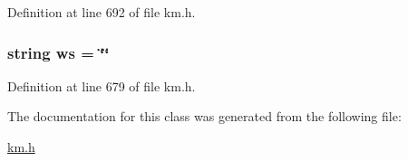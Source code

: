 Definition at line 692 of file km.\+h.

\subsubsection[{\texorpdfstring{ws}{ws}}]{\setlength{\rightskip}{0pt plus 5cm}string ws = \char`\"{}\char`\"{}}\hypertarget{class_k_1_1_gw_a9a2c0c2e6f162d2d9155ba02e513d978}{}\label{class_k_1_1_gw_a9a2c0c2e6f162d2d9155ba02e513d978}


Definition at line 679 of file km.\+h.



The documentation for this class was generated from the following file\+:\begin{DoxyCompactItemize}
\item 
\hyperlink{km_8h}{km.\+h}\end{DoxyCompactItemize}
